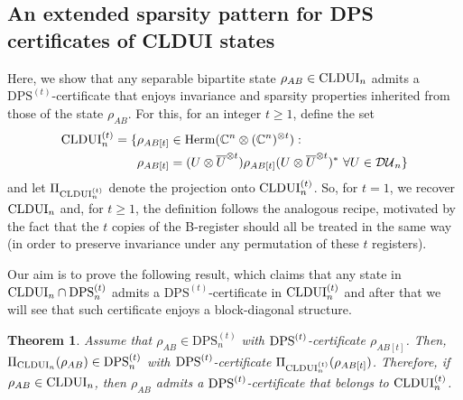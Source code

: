 \documentclass[11pt]{article}
\newcommand{\C}{\ensuremath{\mathbb{C}}} %
\newcommand{\MDU}{{\mathcal {DU}}}
\newcommand{\Herm}{\mathrm{Herm}}
\newcommand{\CLDUI}{\text{\rm CLDUI}}
\newcommand{\LDUI}{\text{\rm LDUI}}
\newcommand{\LDOI}{\text{\rm LDOI}}
\newcommand{\DPS}{\text{\rm DPS}}
\newcommand{\DPSt}{\mathrm{DPS}^{(t)}}
\newcommand{\ot}{\otimes}
\newcommand{\ovU}{\overline U}
\theoremstyle{plain}
\newtheorem{theorem}[satz]{Theorem}
\begin{document}


\subsection{An extended sparsity pattern for DPS certificates of CLDUI states}\label{sec:DPS-CLDUIt-cert}

Here, we  show that any separable bipartite state $\rho_{AB}\in \CLDUI_n$ admits a $\DPSt$-certificate that enjoys invariance and sparsity properties inherited from those of the state $\rho_{AB}$. 
For this, for an integer $t\ge 1$, define the set
\begin{align}\label{def:CLDUI^t}
   \begin{split}
    \CLDUI^{(t)}_n=\{& \rho_{AB[t]}\in\Herm(\C^n\ot(\C^n)^{\ot t}):\\
    & \rho_{AB[t]}= (U\ot \ovU^{\ot t}) \rho_{AB[t]} (U\ot \ovU^{\ot t})^* \ \forall U\in\MDU_n\}
\end{split}\end{align}
and let  $\Pi_{\CLDUI^{(t)}_n}$ denote the projection onto   $\CLDUI^{(t)}_n$.
So, for $t=1$, we recover $\CLDUI_n$ and, for $t\ge 1$, the definition follows the analogous recipe, motivated by the fact that the $t$ copies of the B-register should all be treated in the same way (in order to preserve invariance under any permutation of these $t$ registers).

Our aim is to prove the following result, %
which claims   that any state in $\CLDUI_n\cap \DPSt_n$ admits a $\DPSt$-certificate in $\CLDUI^{(t)}_n$ and after that %
we will see that such certificate enjoys a block-diagonal structure.

\begin{theorem}\label{theo:CLDUItDPSCert}
    Assume that $\rho_{AB}\in\DPSt_n$ with $\DPS^{(t)}$-certificate $\rho_{AB[t]}$. Then, $\Pi_{\CLDUI_n}(\rho_{AB})\in\DPS^{(t)}_n$ with $\DPS^{(t)}$-certificate $\Pi_{\CLDUI^{(t)}_n}(\rho_{AB[t]})$. Therefore, if $\rho_{AB}\in\CLDUI_n$, then $\rho_{AB}$ admits a $\DPS^{(t)}$-certificate that belongs to   $\CLDUI_n^{(t)}$.
\end{theorem}
\end{document}
